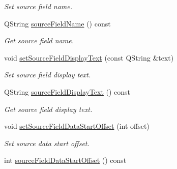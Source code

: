 \begin{DoxyCompactItemize}
\begin{DoxyCompactList}\small\item\em Set source field name. \end{DoxyCompactList}\item 
\hypertarget{classmdt_field_map_item_a6b9da63e50d0b174879a74ea235cea55}{
QString \hyperlink{classmdt_field_map_item_a6b9da63e50d0b174879a74ea235cea55}{sourceFieldName} () const }
\label{classmdt_field_map_item_a6b9da63e50d0b174879a74ea235cea55}

\begin{DoxyCompactList}\small\item\em Get source field name. \end{DoxyCompactList}\item 
\hypertarget{classmdt_field_map_item_a8d0280fb0fac71b77958924e000eb4e5}{
void \hyperlink{classmdt_field_map_item_a8d0280fb0fac71b77958924e000eb4e5}{setSourceFieldDisplayText} (const QString \&text)}
\label{classmdt_field_map_item_a8d0280fb0fac71b77958924e000eb4e5}

\begin{DoxyCompactList}\small\item\em Set source field display text. \end{DoxyCompactList}\item 
\hypertarget{classmdt_field_map_item_aec5bcf5e13a51d91773c66a421c3599f}{
QString \hyperlink{classmdt_field_map_item_aec5bcf5e13a51d91773c66a421c3599f}{sourceFieldDisplayText} () const }
\label{classmdt_field_map_item_aec5bcf5e13a51d91773c66a421c3599f}

\begin{DoxyCompactList}\small\item\em Get source field display text. \end{DoxyCompactList}\item 
void \hyperlink{classmdt_field_map_item_ac23aca5ff0d06f77e63206cd5519311b}{setSourceFieldDataStartOffset} (int offset)
\begin{DoxyCompactList}\small\item\em Set source data start offset. \end{DoxyCompactList}\item 
\hypertarget{classmdt_field_map_item_a03e8193593c5296056896cacc1511b35}{
int \hyperlink{classmdt_field_map_item_a03e8193593c5296056896cacc1511b35}{sourceFieldDataStartOffset} () const }
\label{classmdt_field_map_item_a03e8193593c5296056896cacc1511b35}


\end{DoxyCompactItemize}
